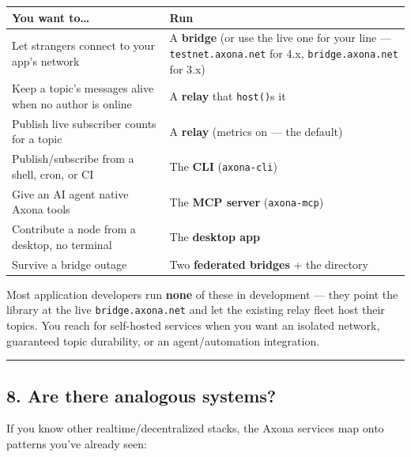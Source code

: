 \documentclass[
  nobib]{tufte-handout}
\newcounter{none} %
\begin{document}
{\def\LTcaptype{none} %
\begin{longtable}[]{@{}
  >{\raggedright\arraybackslash}p{}
  >{\raggedright\arraybackslash}p{}@{}}
\toprule\noalign{}
\begin{minipage}[b]{\linewidth}\raggedright
You want to\ldots{}
\end{minipage} & \begin{minipage}[b]{\linewidth}\raggedright
Run
\end{minipage} \\
\midrule\noalign{}
\endhead
\bottomrule\noalign{}
\endlastfoot
Let strangers connect to your app's network & A \textbf{bridge} (or use
the live one for your line --- \texttt{testnet.axona.net} for 4.x,
\texttt{bridge.axona.net} for 3.x) \\
Keep a topic's messages alive when no author is online & A
\textbf{relay} that \texttt{host()}s it \\
Publish live subscriber counts for a topic & A \textbf{relay} (metrics
on --- the default) \\
Publish/subscribe from a shell, cron, or CI & The \textbf{CLI}
(\texttt{axona-cli}) \\
Give an AI agent native Axona tools & The \textbf{MCP server}
(\texttt{axona-mcp}) \\
Contribute a node from a desktop, no terminal & The \textbf{desktop
app} \\
Survive a bridge outage & Two \textbf{federated bridges} + the
directory \\
\end{longtable}
}

Most application developers run \textbf{none} of these in development
--- they point the library at the live \texttt{bridge.axona.net} and let
the existing relay fleet host their topics. You reach for self-hosted
services when you want an isolated network, guaranteed topic durability,
or an agent/automation integration.

\begin{center}\rule{0.5\linewidth}{0.5pt}\end{center}

\subsection{8. Are there analogous
systems?}\label{are-there-analogous-systems}

If you know other realtime/decentralized stacks, the Axona services map
onto patterns you've already seen:
\end{document}
